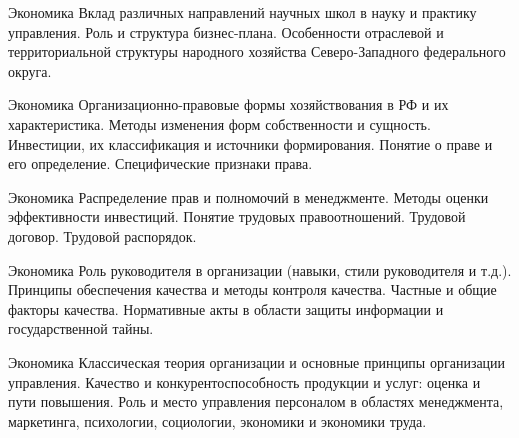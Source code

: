 \documentclass[
	11pt,
	a4paper,
	]
	{article}
\begin{document}
\vfill



\begin{minipage}[t][\miniH]{\miniL}\centering
	 {Экономика}
		{
			Вклад различных направлений научных школ в науку и практику управления.
		}{
			Роль и структура бизнес-плана.
		}{
			Особенности отраслевой и территориальной структуры народного хозяйства Северо-Западного федерального округа.
		}
	\lowGE
\end{minipage}





\begin{minipage}[t][\miniH]{\miniL}\centering
	 {Экономика}
		{
			Организационно-правовые формы хозяйствования в РФ и их характеристика. Методы изменения форм собственности и сущность.
		}{
			Инвестиции, их классификация и источники формирования.
		}{
			Понятие о праве и его определение. Специфические признаки права.
		}
	\lowGE
\end{minipage}

\vfill



\begin{minipage}[t][\miniH]{\miniL}\centering
	 {Экономика}
		{
			Распределение прав и полномочий в менеджменте.
		}{
			Методы оценки эффективности инвестиций.
		}{
			Понятие трудовых правоотношений. Трудовой договор. Трудовой распорядок.
		}
	\lowGE
\end{minipage}

\vfill



\begin{minipage}[t][\miniH]{\miniL}\centering
	 {Экономика}
		{
			Роль руководителя в организации (навыки, стили руководителя и т.д.).
		}{
			Принципы обеспечения качества и методы контроля качества. Частные и общие факторы качества.
		}{
			Нормативные акты в области защиты информации и государственной тайны.
		}
	\lowGE
\end{minipage}





\begin{minipage}[t][\miniH]{\miniL}\centering
	 {Экономика}
		{
			Классическая теория организации и основные принципы организации управления.
		}{
			Качество и конкурентоспособность продукции и услуг: оценка и пути повышения.
		}{
			Роль и место управления персоналом в областях менеджмента, маркетинга, психологии, социологии, экономики и экономики труда.
		}
	\lowGE
\end{minipage}
\end{document}
